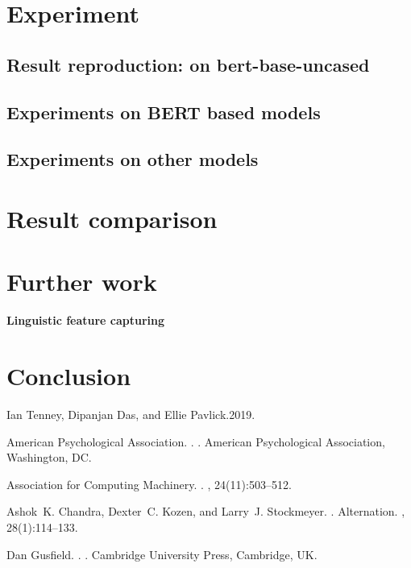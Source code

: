 \documentclass[11pt]{article}
\begin{document}
\section{Experiment}
\subsection{Result reproduction: on bert-base-uncased}
\subsection{Experiments on BERT based models}
\subsection{Experiments on other models}
\section{Result comparison}
\section{Further work}
{\bf Linguistic feature capturing}
\section{Conclusion}







%
%

\begin{thebibliography}{}


Ian Tenney, Dipanjan Das, and Ellie Pavlick.2019.




{American Psychological Association}.
.
.
\newblock American Psychological Association, Washington, DC.

{Association for Computing Machinery}.
.
, 24(11):503--512.

Ashok~K. Chandra, Dexter~C. Kozen, and Larry~J. Stockmeyer.
.
\newblock Alternation.
,
  28(1):114--133.

Dan Gusfield.
.
.
\newblock Cambridge University Press, Cambridge, UK.

\end{thebibliography}
\end{document}
